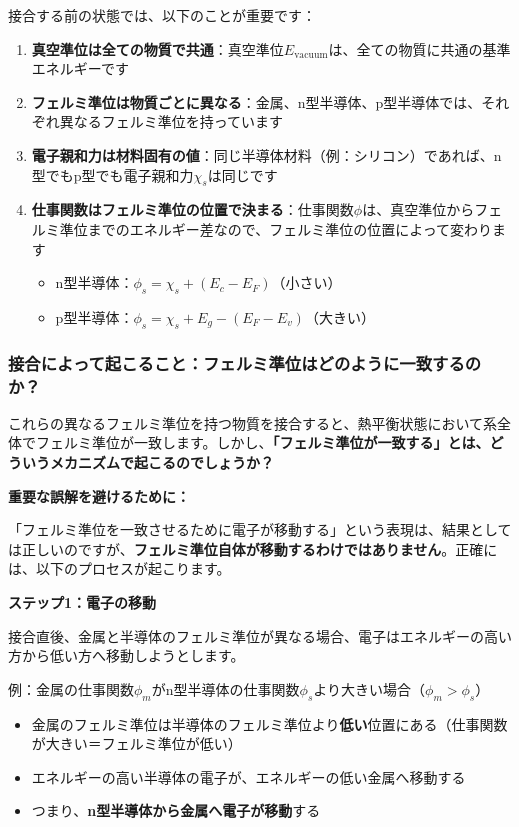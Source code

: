 接合する前の状態では、以下のことが重要です：

\begin{enumerate}
\item \textbf{真空準位は全ての物質で共通}：真空準位$E_{\text{vacuum}}$は、全ての物質に共通の基準エネルギーです

\item \textbf{フェルミ準位は物質ごとに異なる}：金属、n型半導体、p型半導体では、それぞれ異なるフェルミ準位を持っています

\item \textbf{電子親和力は材料固有の値}：同じ半導体材料（例：シリコン）であれば、n型でもp型でも電子親和力$\chi_s$は同じです

\item \textbf{仕事関数はフェルミ準位の位置で決まる}：仕事関数$\phi$は、真空準位からフェルミ準位までのエネルギー差なので、フェルミ準位の位置によって変わります
\begin{itemize}
\item n型半導体：$\phi_s = \chi_s + (E_c - E_F)$（小さい）
\item p型半導体：$\phi_s = \chi_s + E_g - (E_F - E_v)$（大きい）
\end{itemize}
\end{enumerate}

\subsubsection{接合によって起こること：フェルミ準位はどのように一致するのか？}

これらの異なるフェルミ準位を持つ物質を接合すると、熱平衡状態において系全体でフェルミ準位が一致します。しかし、\textbf{「フェルミ準位が一致する」とは、どういうメカニズムで起こるのでしょうか？}

\textbf{重要な誤解を避けるために：}

「フェルミ準位を一致させるために電子が移動する」という表現は、結果としては正しいのですが、\textbf{フェルミ準位自体が移動するわけではありません}。正確には、以下のプロセスが起こります。

\textbf{ステップ1：電子の移動}

接合直後、金属と半導体のフェルミ準位が異なる場合、電子はエネルギーの高い方から低い方へ移動しようとします。

例：金属の仕事関数$\phi_m$がn型半導体の仕事関数$\phi_s$より大きい場合（$\phi_m > \phi_s$）
\begin{itemize}
\item 金属のフェルミ準位は半導体のフェルミ準位より\textbf{低い}位置にある（仕事関数が大きい＝フェルミ準位が低い）
\item エネルギーの高い半導体の電子が、エネルギーの低い金属へ移動する
\item つまり、\textbf{n型半導体から金属へ電子が移動}する
\end{itemize}

